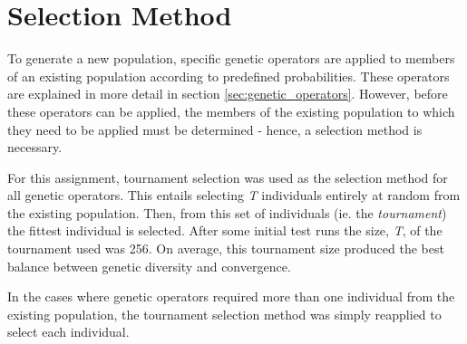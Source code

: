 \section{Selection Method}
To generate a new population, specific genetic operators are applied to members of an existing population according to predefined probabilities. These operators are explained in more detail in section \ref{sec:genetic_operators}. However, before these operators can be applied, the members of the existing population to which they need to be applied must be determined - hence, a selection method is necessary.

For this assignment, tournament selection \cite{miller1995genetic} was used as the selection method for all genetic operators. This entails selecting \emph{T} individuals entirely at random from the existing population. Then, from this set of individuals (ie. the \emph{tournament}) the fittest individual is selected. After some initial test runs the size, \emph{T}, of the tournament used was 256. On average, this tournament size produced the best balance between genetic diversity and convergence.

In the cases where genetic operators required more than one individual from the existing population, the tournament selection method was simply reapplied to select each individual.